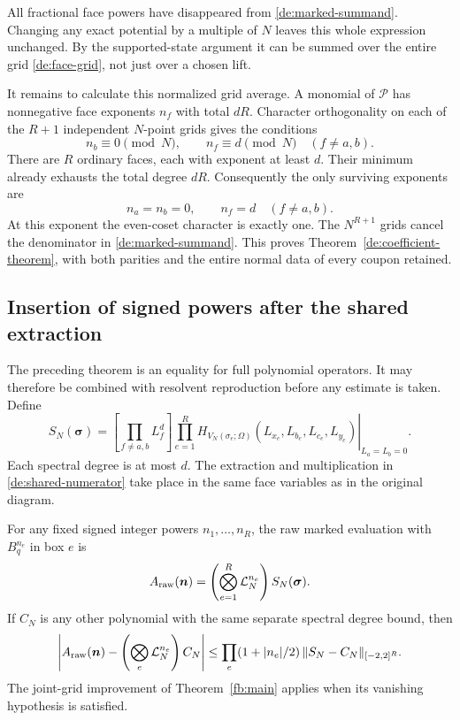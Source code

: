 All fractional face powers have disappeared from
\eqref{de:marked-summand}. Changing any exact potential by a
multiple of \(N\) leaves this whole expression unchanged. By
the supported-state argument it can be summed over the entire
grid \eqref{de:face-grid}, not just over a chosen lift.

It remains to calculate this normalized grid average.
A monomial of \(\mathcal P\) has nonnegative face exponents \(n_f\)
with total \(dR\). Character orthogonality on each of the
\(R+1\) independent \(N\)-point grids gives the conditions
\[
 n_b\equiv0\pmod N,\qquad n_f\equiv d\pmod N
                       \quad(f\ne a,b).
\]
There are \(R\) ordinary faces, each with exponent at least \(d\).
Their minimum already exhausts the total degree \(dR\).
Consequently the only surviving exponents are
\begin{equation}\label{de:unique-target}
             n_a=n_b=0,\qquad n_f=d\quad(f\ne a,b).
\end{equation}
At this exponent the even-coset character is exactly one.
The \(N^{R+1}\) grids cancel the denominator in
\eqref{de:marked-summand}. This proves
Theorem~\ref{de:coefficient-theorem}, with both parities and the
entire normal data of every coupon retained.

\subsection{Insertion of signed powers after the shared extraction}

The preceding theorem is an equality for full polynomial
operators. It may therefore be combined with resolvent
reproduction before any estimate is taken. Define
\begin{equation}\label{de:shared-numerator}
 S_N(\boldsymbol\sigma)=
 \left[\prod_{f\ne a,b}L_f^d\right]
 \left.
 \prod_{e=1}^R H_{V_N(\sigma_e;\Omega)}
        (L_{x_e},L_{b_e},L_{c_e},L_{y_e})
 \right|_{L_a=L_b=0}.
\end{equation}
Each spectral degree is at most \(d\). The extraction and
multiplication in \eqref{de:shared-numerator} take place in the
same face variables as in the original diagram.

\begin{corollary}
\label{de:exact-filling}
For any fixed signed integer powers \(n_1,\ldots,n_R\), the
raw marked evaluation with \(B_q^{n_e}\) in box \(e\) is
\begin{equation}\label{de:tensor-filling}
 A_{\rm raw}(\boldsymbol n)
       =\left(\bigotimes_{e=1}^R\mathcal L_N^{n_e}\right)
                                        S_N(\boldsymbol\sigma).
\end{equation}
If \(C_N\) is any other polynomial with the same separate spectral
degree bound, then
\[
 \left|A_{\rm raw}(\boldsymbol n)
       -\left(\bigotimes_e\mathcal L_N^{n_e}\right)C_N\right|
 \le\prod_e(1+|n_e|/2)\,
                   \|S_N-C_N\|_{[-2,2]^R}.
\]
The joint-grid improvement of Theorem~\ref{fb:main} applies when
its vanishing hypothesis is satisfied.
\end{corollary}

